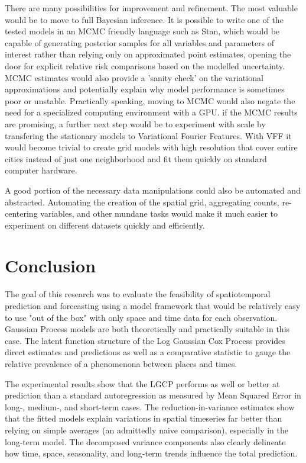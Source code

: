There are many possibilities for improvement and refinement. The most valuable would be to move to full Bayesian inference. It is possible to write one of the tested models in an MCMC friendly language such as Stan, which would be capable of generating posterior samples for all variables and parameters of interest rather than relying only on approximated point estimates, opening the door for explicit relative risk comparisons based on the modelled uncertainty. MCMC estimates would also provide a 'sanity check' on the variational approximations and potentially explain why model performance is sometimes poor or unstable. Practically speaking, moving to MCMC would also negate the need for a specialized computing environment with a GPU. if the MCMC results are promising, a further next step would be to experiment with scale by transfering the stationary models to Variational Fourier Features. With VFF it would become trivial to create grid models with high resolution that cover entire cities instead of just one neighborhood and fit them quickly on standard computer hardware.  \par


A good portion of the necessary data manipulations could also be automated and abstracted. Automating the creation of the spatial grid, aggregating counts, re-centering variables, and other mundane tasks would make it much easier to experiment on different datasets quickly and efficiently.


\section{Conclusion}

The goal of this research was to evaluate the feasibility of spatiotemporal prediction and forecasting using a model framework that would be relatively easy to use "out of the box" with only space and time data for each observation. Gaussian Process models are both theoretically and practically suitable in this case. The latent function structure of the Log Gaussian Cox Process provides direct estimates and predictions as well as a comparative statistic to gauge the relative prevalence of a phenomenona between places and times. \par

The experimental results show that the LGCP performs as well or better at prediction than a standard autoregression as measured by Mean Squared Error in long-, medium-, and short-term cases. The reduction-in-variance estimates show that the fitted models explain variations in spatial timeseries far better than relying on simple averages (an admittedly naive comparison), especially in the long-term model. The decomposed variance components also clearly delineate how time, space, seasonality, and long-term trends influence the total prediction. \par

